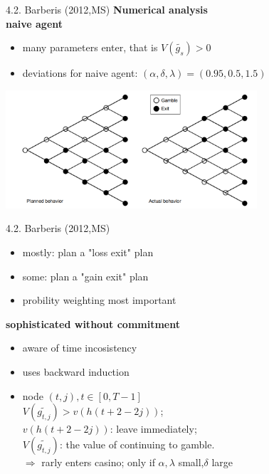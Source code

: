 \documentclass[11pt,aspectratio=169]{beamer}
\begin{document}
\begin{frame}{4.2. Barberis (2012,MS)}
\textbf{Numerical analysis} \\  
\textbf{naive agent} 
    \begin{itemize}
        \item many parameters enter, that is $V(\tilde{g_s})>0 $ \medskip
        \item deviations for naive agent: $(\alpha,\delta,\lambda)=(0.95,0.5,1.5)$
    \end{itemize}
    \includegraphics[width = 0.7\textwidth]{fig3.png}\\
\end{frame}

\begin{frame}{4.2. Barberis (2012,MS)}
    \begin{itemize}
        \item mostly: plan a "loss exit" plan \medskip
        \item some: plan a "gain exit" plan \\
        \item probility weighting most important \medskip
    \end{itemize}
\textbf{sophisticated without commitment}
    \begin{itemize}
        \item aware of time incosistency\medskip
        \item  uses backward induction
        \item node $(t,j),t \in [0,T-1]$\\
        $V(\tilde{g_{t,j}})>v(h(t+2-2j)) $;\\
         $v(h(t+2-2j))$: leave immediately; \\
        $ V(\tilde{g_{t,j}})  $: the value of continuing to gamble.\\
        $\Rightarrow$ rarly enters casino; only if  $\alpha,\lambda $ small,$\delta$ large\\
    \end{itemize}

\end{frame}
\end{document}
